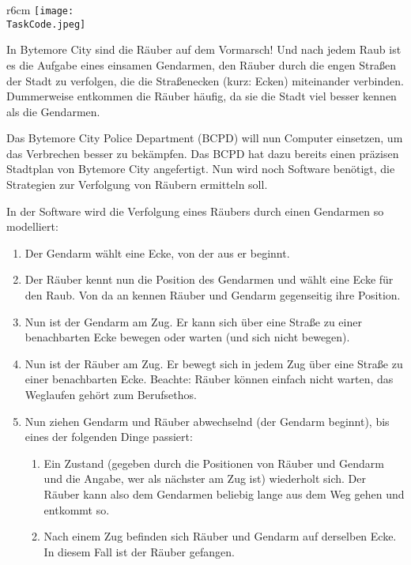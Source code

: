 \documentclass{boi2014-de}
\renewcommand{\TaskCode}{coprobber}
\begin{document}
    \begin{wrapfigure}{r}{6cm}
		\texttt{[image: \\TaskCode.jpeg]}
	\end{wrapfigure}

    In Bytemore City sind die Räuber auf dem Vormarsch!  Und nach jedem Raub
    ist es die Aufgabe eines einsamen Gendarmen, den Räuber durch die engen Straßen
    der Stadt zu verfolgen, die die Straßenecken (kurz: Ecken) miteinander verbinden.
    Dummerweise entkommen die Räuber häufig, da sie die Stadt viel besser kennen als die Gendarmen.

    Das Bytemore City Police Department (BCPD) will nun Computer einsetzen,
    um das Verbrechen besser zu bekämpfen.  Das BCPD hat dazu bereits einen präzisen
    Stadtplan von Bytemore City angefertigt.  Nun wird noch Software benötigt,
    die Strategien zur Verfolgung von Räubern ermitteln soll.

    In der Software wird die Verfolgung eines Räubers durch einen Gendarmen so modelliert:
    \begin{enumerate}
        \item 
        Der Gendarm wählt eine Ecke, von der aus er beginnt.
        \item 
            Der Räuber kennt nun die Position des Gendarmen und wählt eine Ecke für den Raub.
            Von da an kennen Räuber und Gendarm gegenseitig ihre Position.
        \item 
            Nun ist der Gendarm am Zug.  Er kann sich über eine Straße zu einer benachbarten Ecke bewegen 
            oder warten (und sich nicht bewegen).
        \item 
            Nun ist der Räuber am Zug.  Er bewegt sich in jedem Zug über eine Straße zu einer benachbarten Ecke.
            Beachte: Räuber können einfach nicht warten, das Weglaufen gehört zum Berufsethos.
        \item 
        Nun ziehen Gendarm und Räuber abwechselnd (der Gendarm beginnt),
        bis eines der folgenden Dinge passiert:
        
        \begin{enumerate}
            \item 
                Ein Zustand (gegeben durch die Positionen von Räuber und Gendarm und die
                Angabe, wer als nächster am Zug ist) wiederholt sich.
                Der Räuber kann also dem Gendarmen beliebig lange aus dem Weg gehen und entkommt so.
            \item 
                Nach einem Zug befinden sich Räuber und Gendarm auf derselben Ecke.
                In diesem Fall ist der Räuber gefangen.
        \end{enumerate}
    \end{enumerate}
\end{document}
